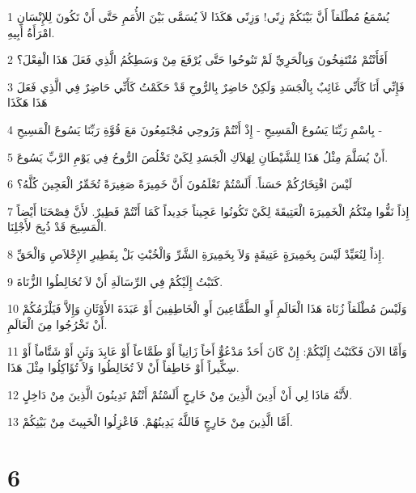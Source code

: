 \par 1 يُسْمَعُ مُطْلَقاً أَنَّ بَيْنَكُمْ زِنًى! وَزِنًى هَكَذَا لاَ يُسَمَّى بَيْنَ الأُمَمِ حَتَّى أَنْ تَكُونَ لِلإِنْسَانِ امْرَأَةُ أَبِيهِ.
\par 2 أَفَأَنْتُمْ مُنْتَفِخُونَ وَبِالْحَرِيِّ لَمْ تَنُوحُوا حَتَّى يُرْفَعَ مِنْ وَسَطِكُمُ الَّذِي فَعَلَ هَذَا الْفِعْلَ؟
\par 3 فَإِنِّي أَنَا كَأَنِّي غَائِبٌ بِالْجَسَدِ وَلَكِنْ حَاضِرٌ بِالرُّوحِ قَدْ حَكَمْتُ كَأَنِّي حَاضِرٌ فِي الَّذِي فَعَلَ هَذَا هَكَذَا
\par 4 بِاسْمِ رَبِّنَا يَسُوعَ الْمَسِيحِ - إِذْ أَنْتُمْ وَرُوحِي مُجْتَمِعُونَ مَعَ قُوَّةِ رَبِّنَا يَسُوعَ الْمَسِيحِ -
\par 5 أَنْ يُسَلَّمَ مِثْلُ هَذَا لِلشَّيْطَانِ لِهَلاَكِ الْجَسَدِ لِكَيْ تَخْلُصَ الرُّوحُ فِي يَوْمِ الرَّبِّ يَسُوعَ.
\par 6 لَيْسَ افْتِخَارُكُمْ حَسَناً. أَلَسْتُمْ تَعْلَمُونَ أَنَّ خَمِيرَةً صَغِيرَةً تُخَمِّرُ الْعَجِينَ كُلَّهُ؟
\par 7 إِذاً نَقُّوا مِنْكُمُ الْخَمِيرَةَ الْعَتِيقَةَ لِكَيْ تَكُونُوا عَجِيناً جَدِيداً كَمَا أَنْتُمْ فَطِيرٌ. لأَنَّ فِصْحَنَا أَيْضاً الْمَسِيحَ قَدْ ذُبِحَ لأَجْلِنَا.
\par 8 إِذاً لِنُعَيِّدْ لَيْسَ بِخَمِيرَةٍ عَتِيقَةٍ وَلاَ بِخَمِيرَةِ الشَّرِّ وَالْخُبْثِ بَلْ بِفَطِيرِ الإِخْلاَصِ وَالْحَقِّ.
\par 9 كَتَبْتُ إِلَيْكُمْ فِي الرِّسَالَةِ أَنْ لاَ تُخَالِطُوا الزُّنَاةَ.
\par 10 وَلَيْسَ مُطْلَقاً زُنَاةَ هَذَا الْعَالَمِ أَوِ الطَّمَّاعِينَ أَوِ الْخَاطِفِينَ أَوْ عَبَدَةَ الأَوْثَانِ وَإِلاَّ فَيَلْزَمُكُمْ أَنْ تَخْرُجُوا مِنَ الْعَالَمِ.
\par 11 وَأَمَّا الآنَ فَكَتَبْتُ إِلَيْكُمْ: إِنْ كَانَ أَحَدٌ مَدْعُوٌّ أَخاً زَانِياً أَوْ طَمَّاعاً أَوْ عَابِدَ وَثَنٍ أَوْ شَتَّاماً أَوْ سِكِّيراً أَوْ خَاطِفاً أَنْ لاَ تُخَالِطُوا وَلاَ تُؤَاكِلُوا مِثْلَ هَذَا.
\par 12 لأَنَّهُ مَاذَا لِي أَنْ أَدِينَ الَّذِينَ مِنْ خَارِجٍ أَلَسْتُمْ أَنْتُمْ تَدِينُونَ الَّذِينَ مِنْ دَاخِلٍ.
\par 13 أَمَّا الَّذِينَ مِنْ خَارِجٍ فَاللَّهُ يَدِينُهُمْ. فَاعْزِلُوا الْخَبِيثَ مِنْ بَيْنِكُمْ.

\chapter{6}

